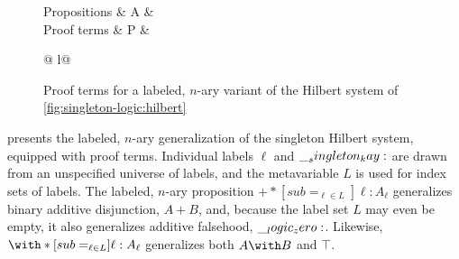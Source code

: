 \begin{figure}[tbp]
  \vspace*{\dimexpr-\abovedisplayskip-\abovecaptionskip\relax}
  \begin{syntax*}
    Propositions &
      A & \alpha \mid {}
                 \mid {}
    \\
    Proof terms &
      P &  \mid \fwd
          \begin{array}[t]{@{{} \mid {}}l@{}}
            \selectR{\kay} \mid {} \\
             \mid \selectL{\kay}
          \end{array}
  \end{syntax*}
  \vspace{-\belowdisplayskip}%
  \caption{Proof terms for a labeled, $n$-ary variant of the Hilbert system of \cref{fig:singleton-logic:hilbert}}%
  \label{fig:singleton-logic:hilbert-terms}
\end{figure}
%
 presents the labeled, $n$-ary generalization of the singleton Hilbert system, equipped with proof terms.
Individual labels $\ell$ and $\__singleton_kay:$ are drawn from an unspecified universe of labels, and the metavariable $L$ is used for index sets of labels.
The labeled, $n$-ary proposition $\plus*[sub=_{\ell \in L}]{\ell:A_{\ell}}$ generalizes binary additive disjunction, $A \plus B$, and, because the label set $L$ may even be empty, it also generalizes additive falsehood, $\__logic_zero:$.
Likewise, $\with*[sub=_{\ell \in L}]{\ell:A_{\ell}}$ generalizes both $A \with B$ and $\top$.

